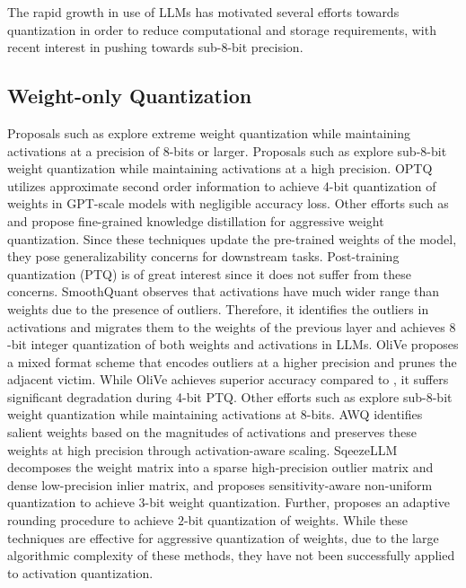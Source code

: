 The rapid growth in use of LLMs has motivated several efforts towards quantization in order to reduce computational and storage requirements, with recent interest in pushing towards sub-8-bit precision. 

\subsection{Weight-only Quantization}
Proposals such as \citep{wang2023bitnet,tseng2024quipbetterllmquantization,egiazarian2024aqlm} explore extreme weight quantization while maintaining activations at a precision of $8$-bits or larger.
Proposals such as \citep{frantar2023optq, bai2021efficient, yao2022zeroquant} explore sub-8-bit weight quantization while maintaining activations at a high precision. OPTQ \citep{frantar2023optq} utilizes approximate second order information to achieve 4-bit quantization of weights in GPT-scale models with negligible accuracy loss. Other efforts such as \citep{yao2022zeroquant} and \citep{bai2021efficient} propose fine-grained knowledge distillation for aggressive weight quantization. Since these techniques update the pre-trained weights of the model, they pose generalizability concerns for downstream tasks. Post-training quantization (PTQ) is of great interest since it does not suffer from these concerns. SmoothQuant \citep{xiao2023smoothquant} observes that activations have much wider range than weights due to the presence of outliers. Therefore, it identifies the outliers in activations and migrates them to the weights of the previous layer and achieves $8$-bit integer quantization of both weights and activations in LLMs. OliVe \citep{Guo2023olive} proposes a mixed format scheme that encodes outliers at a higher precision and prunes the adjacent victim. While OliVe achieves superior accuracy compared to \citep{wei2023outlier}, it suffers significant degradation during 4-bit PTQ. Other efforts such as \citep{lin2023awq,kim2023squeezellm,chee2023quip} explore sub-8-bit weight quantization while maintaining activations at 8-bits. AWQ \citep{lin2023awq} identifies salient weights based on the magnitudes of activations and preserves these weights at high precision through activation-aware scaling. SqeezeLLM \citep{kim2023squeezellm} decomposes the weight matrix into a sparse high-precision outlier matrix and dense low-precision inlier matrix, and proposes sensitivity-aware non-uniform quantization to achieve $3$-bit weight quantization. Further, \citep{chee2023quip} proposes an adaptive rounding procedure to achieve $2$-bit quantization of weights. While these techniques are effective for aggressive quantization of weights, due to the large algorithmic complexity of these methods, they have not been successfully applied to activation quantization.


